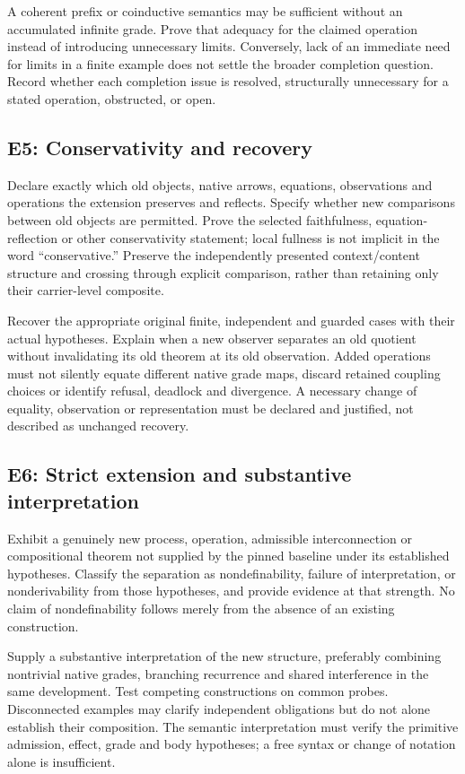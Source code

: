 \documentclass[11pt]{article}
\begin{document}
A coherent prefix or coinductive semantics may be sufficient without an accumulated infinite grade. Prove that adequacy for the claimed operation instead of introducing unnecessary limits. Conversely, lack of an immediate need for limits in a finite example does not settle the broader completion question. Record whether each completion issue is resolved, structurally unnecessary for a stated operation, obstructed, or open.

\subsection*{E5: Conservativity and recovery}
Declare exactly which old objects, native arrows, equations, observations and operations the extension preserves and reflects. Specify whether new comparisons between old objects are permitted. Prove the selected faithfulness, equation-reflection or other conservativity statement; local fullness is not implicit in the word ``conservative.'' Preserve the independently presented context/content structure and crossing through explicit comparison, rather than retaining only their carrier-level composite.

Recover the appropriate original finite, independent and guarded cases with their actual hypotheses. Explain when a new observer separates an old quotient without invalidating its old theorem at its old observation. Added operations must not silently equate different native grade maps, discard retained coupling choices or identify refusal, deadlock and divergence. A necessary change of equality, observation or representation must be declared and justified, not described as unchanged recovery.

\subsection*{E6: Strict extension and substantive interpretation}
Exhibit a genuinely new process, operation, admissible interconnection or compositional theorem not supplied by the pinned baseline under its established hypotheses. Classify the separation as nondefinability, failure of interpretation, or nonderivability from those hypotheses, and provide evidence at that strength. No claim of nondefinability follows merely from the absence of an existing construction.

Supply a substantive interpretation of the new structure, preferably combining nontrivial native grades, branching recurrence and shared interference in the same development. Test competing constructions on common probes. Disconnected examples may clarify independent obligations but do not alone establish their composition. The semantic interpretation must verify the primitive admission, effect, grade and body hypotheses; a free syntax or change of notation alone is insufficient.
\end{document}
